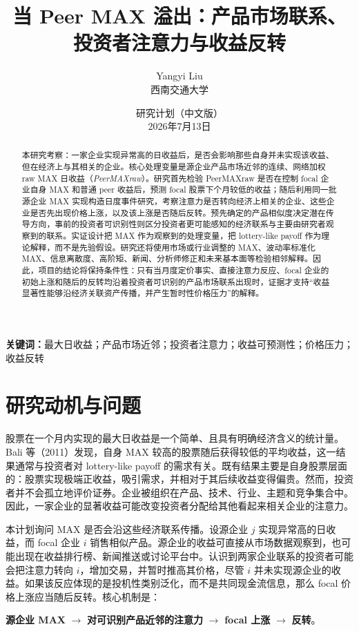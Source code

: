 \documentclass[UTF8,a4paper,11pt]{ctexart}
\title{\textbf{当 Peer MAX 溢出：产品市场联系、投资者注意力与收益反转}}
\author{Yangyi Liu\\西南交通大学}
\date{研究计划（中文版）\\2026年7月13日}
\begin{document}
\maketitle

\begin{abstract}
本研究考察：一家企业实现异常高的日收益后，是否会影响那些自身并未实现该收益、但在经济上与其相关的企业。核心处理变量是源企业产品市场近邻的连续、网络加权 raw MAX 日收益（\emph{PeerMAXraw}）。研究首先检验 PeerMAXraw 是否在控制 focal 企业自身 MAX 和普通 peer 收益后，预测 focal 股票下个月较低的收益；随后利用同一批源企业 MAX 实现构造日度事件研究，考察注意力是否转向经济上相关的企业、这些企业是否先出现价格上涨，以及该上涨是否随后反转。预先确定的产品相似度决定潜在传导方向，事前的投资者可识别性则区分投资者更可能感知的经济联系与主要由研究者观察到的联系。实证设计把 MAX 作为观察到的处理变量，把 lottery-like payoff 作为理论解释，而不是先验假设。研究还将使用市场或行业调整的 MAX、波动率标准化 MAX、信息离散度、高阶矩、新闻、分析师修正和未来基本面等检验相邻解释。因此，项目的结论将保持条件性：只有当月度定价事实、直接注意力反应、focal 企业的初始上涨和随后的反转均沿着投资者可识别的产品市场联系出现时，证据才支持“收益显著性能够沿经济关联资产传播，并产生暂时性价格压力”的解释。
\end{abstract}

\noindent\textbf{关键词：}最大日收益；产品市场近邻；投资者注意力；收益可预测性；价格压力；收益反转

\section{研究动机与问题}
股票在一个月内实现的最大日收益是一个简单、且具有明确经济含义的统计量。Bali 等（2011）发现，自身 MAX 较高的股票随后获得较低的平均收益，这一结果通常与投资者对 lottery-like payoff 的需求有关。既有结果主要是自身股票层面的：股票实现极端正收益，吸引需求，并相对于其后续收益变得偏贵。然而，投资者并不会孤立地评价证券。企业被组织在产品、技术、行业、主题和竞争集合中。因此，一家企业的显著收益可能改变投资者分配给其他看起来相关企业的注意力。

本计划询问 MAX 是否会沿这些经济联系传播。设源企业 $j$ 实现异常高的日收益，而 focal 企业 $i$ 销售相似产品。源企业的收益可直接从市场数据观察到，也可能出现在收益排行榜、新闻推送或讨论平台中。认识到两家企业联系的投资者可能会把注意力转向 $i$，增加交易，并暂时推高其价格，尽管 $i$ 并未实现源企业的收益。如果该反应体现的是投机性类别泛化，而不是共同现金流信息，那么 focal 价格上涨应当随后反转。核心机制是：

\begin{center}
\textbf{源企业 MAX} $\longrightarrow$ \textbf{对可识别产品近邻的注意力} $\longrightarrow$ \textbf{focal 上涨} $\longrightarrow$ \textbf{反转}。
\end{center}
\end{document}
